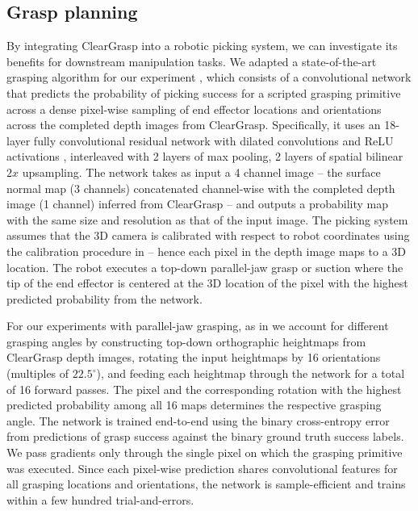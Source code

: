 \documentclass[letterpaper, 10 pt, conference]{ieeeconf}
\begin{document}
\subsection{Grasp planning}
\label{sec:grasping}
By integrating ClearGrasp into a robotic picking system, we can investigate its benefits for downstream manipulation tasks. We adapted a state-of-the-art grasping algorithm for our experiment \cite{zeng2018robotic,zeng2018learning,zeng2019tossingbot}, which consists of a convolutional network that predicts the probability of picking success for a scripted grasping primitive across a dense pixel-wise sampling of end effector locations and orientations across the completed depth images from ClearGrasp. Specifically, it uses an 18-layer fully convolutional residual network \cite{he2016deep} with dilated convolutions \cite{Yu2017} and ReLU activations \cite{nair2010rectified}, interleaved with 2 layers of max pooling, 2 layers of spatial bilinear $2x$ upsampling. 
The network takes as input a 4 channel image -- the surface normal map (3 channels) concatenated channel-wise with the completed depth image (1 channel) inferred from ClearGrasp -- and outputs a probability map with the same size and resolution as that of the input image. The picking system assumes that the 3D camera is calibrated with respect to robot coordinates using the calibration procedure in \cite{zeng2018learning} -- hence each pixel in the depth image maps to a 3D location. The robot executes a top-down parallel-jaw grasp or suction where the tip of the end effector is centered at the 3D location of the pixel with the highest predicted probability from the network.

For our experiments with parallel-jaw grasping, as in \cite{zeng2018robotic} we account for different grasping angles by constructing top-down orthographic heightmaps from ClearGrasp depth images, rotating the input heightmaps by 16 orientations (multiples of $22.5^\circ$), and feeding each heightmap through the network for a total of 16 forward passes. The pixel and the corresponding rotation with the highest predicted probability among all 16 maps determines the respective grasping angle. The network is trained end-to-end using the binary cross-entropy error from predictions of grasp success against the binary ground truth success labels. We pass gradients only through the single pixel on which the grasping primitive was executed. Since each pixel-wise prediction shares convolutional features for all grasping locations and orientations, the network is sample-efficient and trains within a few hundred trial-and-errors.
\end{document}
